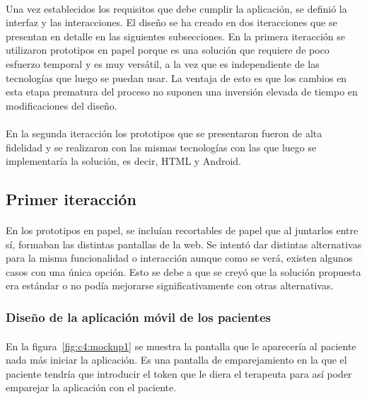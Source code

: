 \paragraph{}
Una vez establecidos los requisitos que debe cumplir la aplicación, se definió la interfaz y las interacciones. El diseño se ha creado en dos iteracciones que se presentan en detalle en las siguientes subsecciones. En la primera iteracción se utilizaron prototipos en papel porque es una solución que requiere de poco esfuerzo temporal y es muy versátil, a la vez que es independiente de las tecnologías que luego se puedan usar. La ventaja de esto es que los cambios en esta etapa prematura del proceso no suponen una inversión elevada de tiempo en modificaciones del diseño.

\paragraph{}
En la segunda iteracción los prototipos que se presentaron fueron de alta fidelidad y se realizaron con las mismas tecnologías con las que luego se implementaría la solución, es decir, HTML y Android.

\subsection{Primer iteracción}
\paragraph{}
En los prototipos en papel, se incluían recortables de papel que al juntarlos entre sí, formaban las distintas pantallas de la web. Se intentó dar distintas alternativas para la misma funcionalidad o interacción aunque como se verá, existen algunos casos con una única opción. Esto se debe a que se creyó que la solución propuesta era estándar o no podía mejorarse significativamente con otras alternativas.

\subsubsection{Diseño de la aplicación móvil de los pacientes}

\paragraph{}
En la figura~\ref{fig:c4:mockup1} se muestra la pantalla que le aparecería al paciente nada más iniciar la aplicación. Es una pantalla de emparejamiento en la que el paciente tendría que introducir el token que le diera el terapeuta para así poder emparejar la aplicación con el paciente.

